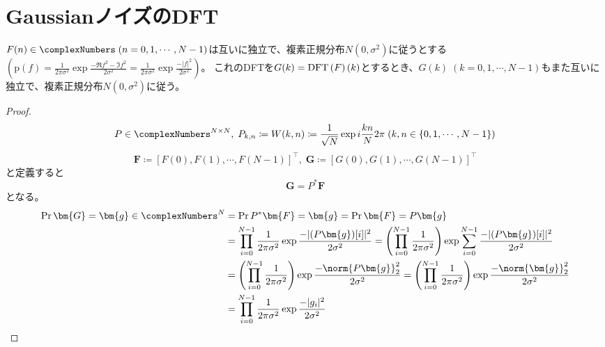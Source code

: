 		\section{GaussianノイズのDFT}
			\begin{shadebox}
				$F(n) \in \complexNumbers\;(n=0,1,\cdots,N-1)$は互いに独立で、複素正規分布$N(0,\sigma^2)$に従うとする$\left(\text{p}(f) = \frac{1}{2\pi\sigma^2}\exp\frac{-\Re{f}^2-\Im{f}^2}{2\sigma^2} = \frac{1}{2\pi\sigma^2}\exp\frac{-|f|^2}{2\sigma^2}\right)$。
				これのDFTを$G(k) = \mathrm{DFT}\left(F\right)\left(k\right)$とするとき、$G(k)\;(k=0,1,\cdots,N-1)$もまた互いに独立で、複素正規分布$N(0,\sigma^2)$に従う。
			\end{shadebox}
			\begin{proof}
				\[ P \in \complexNumbers^{N\times N},\; P_{k,n} \coloneqq W(k,n) \coloneqq \frac{1}{\sqrt{N}}\exp i\frac{kn}{N}2\pi\;(k,n \in \{0,1,\cdots,N-1\}) \]
				\[ \bm{F} \coloneqq [F(0), F(1), \cdots, F(N-1)]^\top,\;\bm{G} \coloneqq [G(0), G(1), \cdots, G(N-1)]^\top \]
				と定義すると
				\[ \bm{G} = P^*\bm{F} \]
				となる。
				\begin{align*}
					\Pr{\bm{G} = \bm{g} \in \complexNumbers^N} &= \Pr{P^*\bm{F} = \bm{g}} = \Pr{\bm{F} = P\bm{g}} \\
					&= \prod_{i=0}^{N-1}\frac{1}{2\pi\sigma^2} \exp\frac{-|(P\bm{g})[i]|^2}{2\sigma^2} = \left(\prod_{i=0}^{N-1}\frac{1}{2\pi\sigma^2}\right) \exp \sum_{i=0}^{N-1} \frac{-|(P\bm{g})[i]|^2}{2\sigma^2} \\
					&= \left(\prod_{i=0}^{N-1}\frac{1}{2\pi\sigma^2}\right) \exp \frac{-\norm{P\bm{g}}_2^2}{2\sigma^2} = \left(\prod_{i=0}^{N-1}\frac{1}{2\pi\sigma^2}\right) \exp \frac{-\norm{\bm{g}}_2^2}{2\sigma^2} \\
					&= \prod_{i=0}^{N-1}\frac{1}{2\pi\sigma^2} \exp \frac{-|g_i|^2}{2\sigma^2}
				\end{align*}
			\end{proof}

